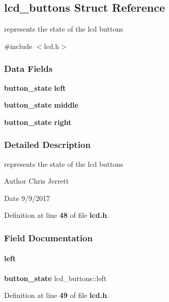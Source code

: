 \subsection{lcd\+\_\+buttons Struct Reference}
\label{a00163}


represents the state of the lcd buttons  




{\ttfamily \#include $<$lcd.\+h$>$}

\subsubsection*{Data Fields}
\begin{DoxyCompactItemize}
\item 
\textbf{ button\+\_\+state} \textbf{ left}
\item 
\textbf{ button\+\_\+state} \textbf{ middle}
\item 
\textbf{ button\+\_\+state} \textbf{ right}
\end{DoxyCompactItemize}


\subsubsection{Detailed Description}
represents the state of the lcd buttons 

\begin{DoxyAuthor}{Author}
Chris Jerrett 
\end{DoxyAuthor}
\begin{DoxyDate}{Date}
9/9/2017 
\end{DoxyDate}


Definition at line \textbf{ 48} of file \textbf{ lcd.\+h}.



\subsubsection{Field Documentation}
\mbox{\label{a00163_ae385efb5ec794acf5f11027f46c6c039}} 
\paragraph{left}
{\footnotesize\ttfamily \textbf{ button\+\_\+state} lcd\+\_\+buttons\+::left}



Definition at line \textbf{ 49} of file \textbf{ lcd.\+h}.



